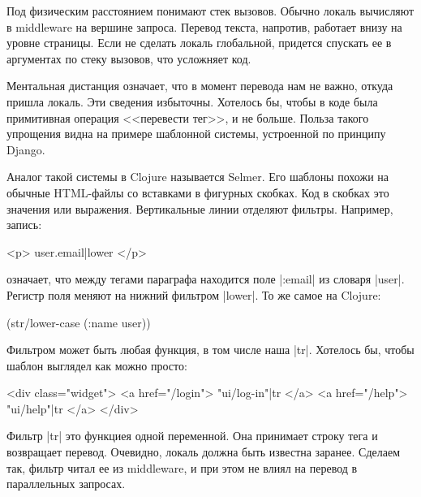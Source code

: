 Под физическим расстоянием понимают стек вызовов. Обычно локаль вычисляют в
middleware на вершине запроса. Перевод текста, напротив, работает внизу на
уровне страницы. Если не сделать локаль глобальной, придется спускать ее в
аргументах по стеку вызовов, что усложняет код.

Ментальная дистанция означает, что в момент перевода нам не важно, откуда пришла
локаль. Эти сведения избыточны. Хотелось бы, чтобы в коде была примитивная
операция <<перевести тег>>, и не больше. Польза такого упрощения видна на
примере шаблонной системы, устроенной по принципу
Django.

Аналог такой системы в Clojure называется
Selmer. Его шаблоны похожи на обычные
HTML-файлы со вставками в фигурных скобках. Код в скобках это значения или
выражения. Вертикальные линии отделяют фильтры. Например, запись:

\begin{english}
  \begin{htmldjango}
<p>{{ user.email|lower }}</p>
  \end{htmldjango}
\end{english}

\noindent
означает, что между тегами параграфа находится поле \spverb|:email| из словаря
\spverb|user|. Регистр поля меняют на нижний фильтром \spverb|lower|. То же
самое на Clojure:

\begin{english}
  \begin{clojure}
(str/lower-case (:name user))
  \end{clojure}
\end{english}

Фильтром может быть любая функция, в том числе наша \spverb|tr|. Хотелось бы,
чтобы шаблон выглядел как можно просто:

\begin{english}
  \begin{htmldjango}
<div class="widget">
  <a href="/login">{{ "ui/log-in"|tr }}</a>
  <a href="/help">{{ "ui/help"|tr }}</a>
</div>
  \end{htmldjango}
\end{english}

Фильтр \spverb|tr| это функциея одной переменной. Она принимает строку тега и
возвращает перевод. Очевидно, локаль должна быть известна заранее. Сделаем так,
фильтр читал ее из middleware, и при этом не влиял на перевод в параллельных
запросах.

